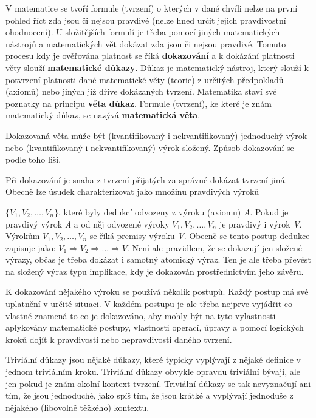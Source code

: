 V matematice se tvoří formule (tvrzení) o kterých v dané chvíli nelze na první pohled říct zda jsou či nejsou pravdivé (nelze hned určit jejich pravdivostní ohodnocení). U složitějších formulí je třeba pomocí jiných matematických nástrojů a matematických vět dokázat zda jsou či nejsou pravdivé. Tomuto procesu kdy je ověřována platnost se říká {\bf dokazování} a k dokázání platnosti věty slouží {\bf matematické důkazy}. Důkaz je matematický nástroj, který slouží k potvrzení platnosti dané matematické věty (teorie) z určitých předpokladů (axiomů) nebo jiných již dříve dokázaných tvrzení. Matematika staví své poznatky na principu {\bf věta důkaz}.  Formule (tvrzení), ke které je znám matematický důkaz, se nazývá {\bf matematická věta}.

Dokazovaná věta může být (kvantifikovaný i nekvantifikovaný) jednoduchý výrok nebo (kvantifikovaný i nekvantifikovaný) výrok složený. Způsob dokazování se podle toho liší.

Při dokazování je snaha z tvrzení přijatých za správné dokázat tvrzení jiná. Obecně lze úsudek charakterizovat jako množinu pravdivých výroků \par\noindent $\{ V_1, V_2, …, V_n\}$, které byly dedukcí odvozeny z výroku (axiomu) {\it A}. Pokud je pravdivý výrok {\it A} a od něj odvozené výroky $V_1, V_2, …, V_n$ je pravdivý i výrok {\it V}. Výrokům  $V_1, V_2, …, V_n$ se říká premisy výroku {\it V}. Obecně se tento postup dedukce zapisuje jako: $V_1 \Rightarrow V_2 \Rightarrow ... \Rightarrow V$. Není ale pravidlem, že se dokazují jen složené výrazy, občas je třeba dokázat i samotný atomický výraz. Ten je ale třeba převést na složený výraz typu implikace, kdy je dokazován prostřednictvím jeho závěru.

K dokazování nějakého výroku se používá několik postupů. Každý postup má své uplatnění v určité situaci. V každém postupu je ale třeba nejprve vyjádřit co vlastně znamená to co je dokazováno, aby mohly být na tyto vylastnosti aplykovány matematické postupy, vlastnosti operací, úpravy a pomocí logických kroků dojít k pravdivosti nebo nepravdivosti daného tvrzení. 


Triviální důkazy jsou nějaké důkazy, které typicky vyplývají z nějaké definice v jednom triviálním kroku. Triviální důkazy obvykle opravdu triviální bývají, ale jen pokud je znám okolní kontext tvrzení. Triviální důkazy se tak nevyznačují ani tím, že jsou jednoduché, jako spíš tím, že jsou krátké a vyplývají jednoduše z nějakého (libovolně těžkého) kontextu. 

